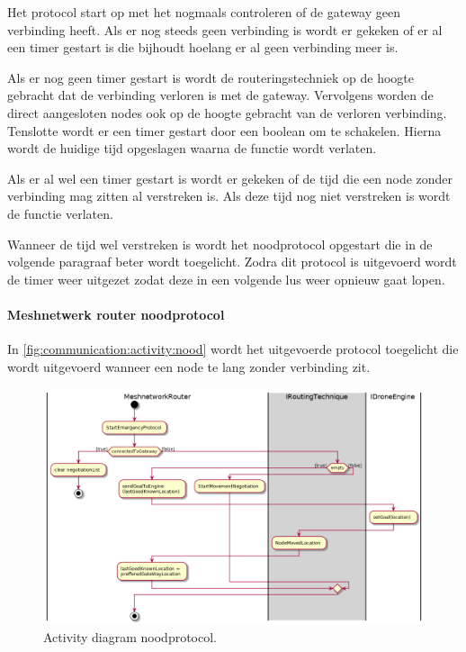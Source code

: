 \documentclass[a4paper, 11pt, oneside]{report}
\begin{document}
Het protocol start op met het nogmaals controleren of de gateway geen verbinding heeft.
Als er nog steeds geen verbinding is wordt er gekeken of er al een timer gestart is die bijhoudt hoelang er al geen verbinding meer is.

Als er nog geen timer gestart is wordt de routeringstechniek op de hoogte gebracht dat de verbinding verloren is met de gateway.
Vervolgens worden de direct aangesloten nodes ook op de hoogte gebracht van de verloren verbinding.
Tenslotte  wordt er een timer gestart door een boolean om te schakelen.
Hierna wordt de huidige tijd opgeslagen waarna de functie wordt verlaten.

Als er al wel een timer gestart is wordt er gekeken of de tijd die een node zonder verbinding mag zitten al verstreken is.
Als deze tijd nog niet verstreken is wordt de functie verlaten.

Wanneer de tijd wel verstreken is wordt het noodprotocol opgestart die in de volgende paragraaf beter wordt toegelicht.
Zodra dit protocol is uitgevoerd wordt de timer weer uitgezet zodat deze in een volgende lus weer opnieuw gaat lopen.
\pagebreak
\paragraph{Meshnetwerk router noodprotocol}
In \autoref{fig:communication:activity:nood} wordt het uitgevoerde protocol toegelicht die wordt uitgevoerd wanneer een node te lang zonder verbinding zit.

\begin{figure}[H]
	\begin{center}\includegraphics[width=\linewidth]{UML/out/Communication/activity/EmergencyProtocol/EmergencyProtocol.png}\end{center}
	\caption{Activity diagram noodprotocol.}
	\label{fig:communication:activity:nood}
\end{figure}
\end{document}
